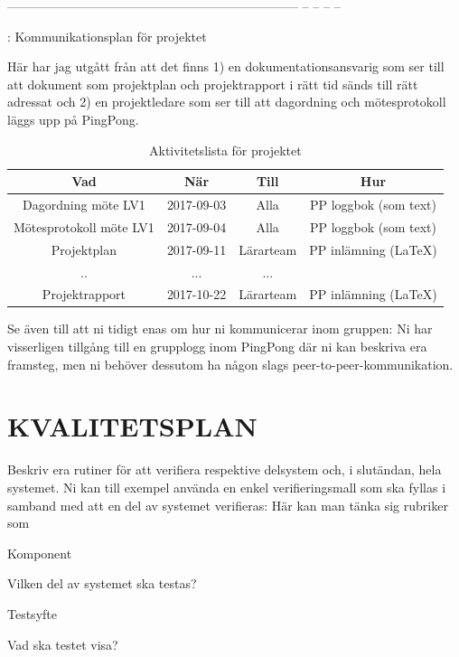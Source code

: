 \documentclass[a4paper]{article}
\begin{document}
  --------------------------------------------------------------------- -- -- -- --

  : Kommunikationsplan för projektet

Här har jag utgått från att det finns 1) en dokumentationsansvarig som
ser till att dokument som projektplan och projektrapport i rätt tid
sänds till rätt adressat och 2) en projektledare som ser till att
dagordning och mötesprotokoll läggs upp på PingPong.

\begin{table}
\begin{center}
\begin{tabular}{ |c|c|c|c| } 
 \hline
 Vad & När & Till & Hur \\ 
 \hline
 \hline
 Dagordning möte LV1 & 2017-09-03 & Alla & PP loggbok (som text)\\ 
 \hline
 Mötesprotokoll möte LV1 & 2017-09-04 & Alla & PP loggbok (som text) \\ 
 \hline
 Projektplan & 2017-09-11 & Lärarteam & PP inlämning (LaTeX) \\ 
 \hline
 .. & ... & ... &  \\
 \hline
 Projektrapport & 2017-10-22 & Lärarteam & PP inlämning (LaTeX) \\
 \hline
\end{tabular}
\caption{Aktivitetslista för projektet}
\label{tabellnamnförreferens}
\end{center}
\end{table}


Se även till att ni tidigt enas om hur ni kommunicerar inom gruppen:
Ni har visserligen tillgång till en grupplogg inom PingPong där ni kan
beskriva era framsteg, men ni behöver dessutom ha någon slags
peer-to-peer-kommunikation.



\section{KVALITETSPLAN}


Beskriv era rutiner för att verifiera respektive delsystem och, i
slutändan, hela systemet. Ni kan till exempel använda en enkel
verifieringsmall som ska fyllas i samband med att en del av systemet
verifieras: Här kan man tänka sig rubriker som

Komponent

    Vilken del av systemet ska testas?

Testsyfte

    Vad ska testet visa?
\end{document}
